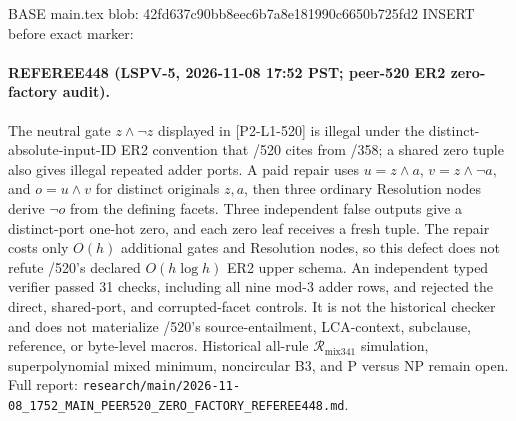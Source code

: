 BASE main.tex blob: 42fd637c90bb8eec6b7a8e181990c6650b725fd2
INSERT before exact marker: %

\paragraph{REFEREE448 (LSPV-5, 2026-11-08 17:52 PST; peer-520 ER2 zero-factory audit).}
The neutral gate $z\wedge\neg z$ displayed in [P2-L1-520] is illegal under
the distinct-absolute-input-ID ER2 convention that /520 cites from /358; a
shared zero tuple also gives illegal repeated adder ports.  A paid repair uses
$u=z\wedge a$, $v=z\wedge\neg a$, and $o=u\wedge v$ for distinct originals
$z,a$, then three ordinary Resolution nodes derive $\neg o$ from the defining
facets.  Three independent false outputs give a distinct-port one-hot zero,
and each zero leaf receives a fresh tuple.  The repair costs only $O(h)$
additional gates and Resolution nodes, so this defect does not refute /520's
declared $O(h\log h)$ ER2 upper schema.  An independent typed verifier passed
31 checks, including all nine mod-$3$ adder rows, and rejected the direct,
shared-port, and corrupted-facet controls.  It is not the historical checker
and does not materialize /520's source-entailment, LCA-context, subclause,
reference, or byte-level macros.  Historical all-rule
$\mathcal R_{\mathrm{mix341}}$ simulation, superpolynomial mixed minimum,
noncircular B3, and P versus NP remain open.  Full report:
\texttt{research/main/2026-11-08\_1752\_MAIN\_PEER520\_ZERO\_FACTORY\_REFEREE448.md}.
